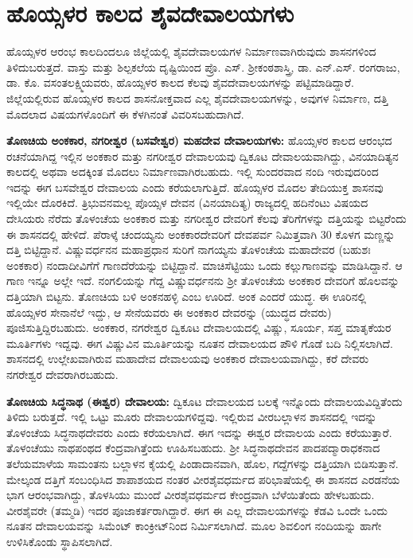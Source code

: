 \vskip -1pt

\section*{ಹೊಯ್ಸಳರ ಕಾಲದ ಶೈವದೇವಾಲಯಗಳು}

ಹೊಯ್ಸಳರ ಆರಂಭ ಕಾಲದಿಂದಲೂ ಜಿಲ್ಲೆಯಲ್ಲಿ ಶೈವದೇವಾಲಯಗಳ ನಿರ್ಮಾಣವಾಗಿರುವುದು ಶಾಸನಗಳಿಂದ ತಿಳಿದು\-ಬರುತ್ತದೆ. ವಾಸ್ತು ಮತ್ತು ಶಿಲ್ಪಕಲೆಯ ದೃಷ್ಟಿಯಿಂದ ಪ್ರೊ. ಎಸ್​. ಶ‍್ರೀಕಂಠಶಾಸ್ತ್ರಿ, ಡಾ. ಎನ್​.ಎಸ್​. ರಂಗರಾಜು, ಡಾ. ಕೊ. ವಸಂತಲಕ್ಷ್ಮಿ\-ಯವರು, ಹೊಯ್ಸಳರ ಕಾಲದ ಕೆಲವು ಶೈವದೇವಾಲಯಗಳನ್ನು ಪಟ್ಟಿಮಾಡಿದ್ದಾರೆ. ಜಿಲ್ಲೆಯಲ್ಲಿರುವ ಹೊಯ್ಸಳರ ಕಾಲದ ಶಾಸನೋಕ್ತವಾದ ಎಲ್ಲ ಶೈವದೇವಾಲಯಗಳನ್ನು, ಅವುಗಳ ನಿರ್ಮಾಣ, ದತ್ತಿ ಮೊದಲಾದ ವಿಷಯಗಳೊಂದಿಗೆ ಈ ಕೆಳಗಿನಂತೆ ವಿವರಿಸಬಹುದಾಗಿದೆ.

\textbf{ತೊಣಚಿಯ ಅಂಕಕಾರ, ನಗರೀಶ್ವರ (ಬಸವೇಶ್ವರ) ಮಹದೇವ ದೇವಾಲಯಗಳು:} ಹೊಯ್ಸಳರ ಕಾಲದ ಆರಂಭದ ರಚನೆಯಾಗಿದ್ದ ಇಲ್ಲಿನ ಅಂಕಕಾರ ಮತ್ತು ನಗರೀಶ್ವರ ದೇವಾಲಯವು ದ್ವಿಕೂಟ ದೇವಾಲಯವಾಗಿದ್ದು, ವಿನಯಾದಿತ್ಯನ ಕಾಲದಲ್ಲಿ ಅಥವಾ ಅದಕ್ಕಿಂತ ಮೊದಲು ನಿರ್ಮಾಣವಾಗಿರ\-ಬಹುದು. ಇಲ್ಲಿ ಸುಂದರವಾದ ನಂದಿ ಇರುವುದರಿಂದ ಇದನ್ನು ಈಗ ಬಸವೇಶ್ವರ ದೇವಾಲಯ ಎಂದು ಕರೆಯಲಾಗುತ್ತಿದೆ. ಹೊಯ್ಸಳರ ಮೊದಲ ತೇದಿಯುಕ್ತ ಶಾಸನವು ಇಲ್ಲಿಯೇ ದೊರಕಿದೆ. ತ್ರಿಭುವನಮಲ್ಲ ಪೊಯ್ಸಳ ದೇವನ (ವಿನಯಾದಿತ್ಯ) ರಾಜ್ಯದಲ್ಲಿ ಹದಿನೆಂಟು ವಿಷಯದ ದೇಸಿಯರು ನೆರೆದು ತೊಳಂಚೆಯ ಅಂಕಕಾರ ಮತ್ತು ನಗರೀಶ್ವರ ದೇವರಿಗೆ ಕೆಲವು ತೆರಿಗೆಗಳನ್ನು ದತ್ತಿಯನ್ನು ಬಿಟ್ಟರೆಂದು ಈ ಶಾಸನದಲ್ಲಿ ಹೇಳಿದೆ. ಪೆರಾಳ್ಕೆ ಚಂದಯ್ಯನು ಅಂಕಕಾರದೇವರಿಗೆ ದೇವಪರ್ವ ನಿಮಿತ್ತವಾಗಿ 30 ಕೊಳಗ ಮಣ್ಣನ್ನು ದತ್ತಿ ಬಿಟ್ಟಿದ್ದಾನೆ. ವಿಷ್ಣುವರ್ಧನನ ಮಹಾಪ್ರಧಾನ ಸುರಿಗೆ ನಾಗಯ್ಯನು ತೊಳಂಚೆಯ ಮಹಾದೇವರ (ಬಹುಶಃ ಅಂಕಕಾರ) ನಂದಾದೀವಿಗೆಗೆ ಗಾಣದೆರೆಯನ್ನು ಬಿಟ್ಟಿದ್ದಾನೆ. ಮಾಚಿಸೆಟ್ಟಿಯು ಒಂದು ಕಲ್ಲುಗಾಣವನ್ನು ಮಾಡಿಸಿದ್ದಾನೆ. ಆ ಗಾಣ ಇನ್ನೂ ಅಲ್ಲೇ ಇದೆ. ನಂಗಲಿಯನ್ನು ಗೆದ್ದ ವಿಷ್ಣುವರ್ಧನನು ಶ‍್ರೀ ತೊಳಂಚೆಯ ಅಂಕಕಾರ ದೇವರಿಗೆ ಹೊಲವನ್ನು ದತ್ತಿಯಾಗಿ ಬಿಟ್ಟನು. ತೊಣಚಿಯ ಬಳಿ ಅಂಕನಹಳ್ಳಿ ಎಂಬ ಊರಿದೆ. ಅಂಕ ಎಂದರೆ ಯುದ್ಧ. ಈ ಊರಿನಲ್ಲಿ ಹೊಯ್ಸಳರ ಸೇನಾನೆಲೆ ಇದ್ದು, ಆ ಸೇನೆಯವರು ಈ ಅಂಕಕಾರ ದೇವರನ್ನು (ಯುದ್ಧದ ದೇವರು) ಪೂಜಿಸುತ್ತಿದ್ದಿರಬಹುದು. ಅಂಕಕಾರ, ನಗರೇಶ್ವರ ದ್ವಿಕೂಟ ದೇವಾಲಯದಲ್ಲಿ ವಿಷ್ಣು, ಸೂರ್ಯ, ಸಪ್ತ ಮಾತೃಕೆಯರ ಮೂರ್ತಿಗಳು ಇದ್ದವು. ಈಗ ವಿಷ್ಣುವಿನ ಮೂರ್ತಿಯನ್ನು ನೂತನ ದೇವಾಲಯದ ಪೌಳಿ ಗೊಡೆ ಬದಿ ನಿಲ್ಲಿಸಲಾಗಿದೆ. ಶಾಸನದಲ್ಲಿ ಉಲ್ಲೇಖವಾಗಿರುವ ಮಹಾದೇವ ದೇವಾಲಯವು ಅಂಕಕಾರ ದೇವಾಲಯವಾಗಿದ್ದು, ಕರೆ ದೇವರು ನಗರೇಶ್ವರ ದೇವರಾಗಿರಬಹುದು.

\textbf{ತೊಣಚಿಯ ಸಿದ್ಧನಾಥ (ಈಶ್ವರ) ದೇವಾಲಯ:} ದ್ವಿಕೂಟ ದೇವಾಲಯದ ಬಲಕ್ಕೆ ಇನ್ನೊಂದು ದೇವಾಲಯವಿದ್ದಿತೆಂದು ತಿಳಿದು ಬರುತ್ತದೆ. ಇಲ್ಲಿ ಒಟ್ಟು ಮೂರು ದೇವಾಲಯಗಳಿದ್ದವು. ಇಲ್ಲಿರುವ ವೀರಬಲ್ಲಾಳನ ಶಾಸನದಲ್ಲಿ ಇದನ್ನು ತೊಳಂಚೆಯ ಸಿದ್ಧನಾಥದೇವರು ಎಂದು ಕರೆಯಲಾಗಿದೆ. ಈಗ ಇದನ್ನು ಈಶ್ವರ ದೇವಾಲಯ ಎಂದು ಕರೆಯುತ್ತಾರೆ. ತೊಳಂಚೆಯು ನಾಥಪಂಥದ ಕೆಂದ್ರವಾಗಿತ್ತೆಂದು ಊಹಿಸಬಹುದು. ಶ‍್ರೀ ಸಿದ್ಧನಾಥದೇವನ ಪಾದಪದ್ಮಾರಾಧಕ\-ನಾದ ತಲೆಯಮಾಳೆಯ ಸಾಮಂತನು ಬಲ್ಲಾಳನ ಕೈಯಲ್ಲಿ ಪಿಂಡಾದಾನವಾಗಿ, ಹೊಲ, ಗದ್ದೆಗಳನ್ನು ದತ್ತಿಯಾಗಿ ಬಿಡಿಸುತ್ತಾನೆ. ಮೇಲ್ಕಂಡ ದತ್ತಿಗೆ ಸಂಬಂಧಿಸಿದ ಶಾಪಾಶಯದ ನಂತರ ವೀರಶೈವಧರ್ಮದ ಪರಿಭಾಷೆಯಲ್ಲಿ ಈ ಶಾಸನದ ಎರಡನೆಯ ಭಾಗ ಆರಂಭವಾಗಿದ್ದು, ತೊಳಸಿಯು ಮುಂದೆ ವೀರಶೈವಧರ್ಮದ ಕೇಂದ್ರವಾಗಿ ಬೆಳೆಯಿತೆಂದು ಹೇಳಬಹುದು. ವೀರಶೈವರೇ (ತಮ್ಮಡಿ) ಇದರ ಪೂಜಾಕರ್ತರಾಗಿ\-ದ್ದಾರೆ. ಈಗ ಈ ಎಲ್ಲ ದೇವಾಲಯಗಳನ್ನು ಕೆಡವಿ ಒಂದೇ ಒಂದು ನೂತನ ದೇವಾಲಯವನ್ನು ಸಿಮೆಂಟ್ ಕಾಂಕ್ರೀಟ್‌ನಿಂದ ನಿರ್ಮಿಸಲಾಗಿದೆ. ಮೂಲ ಶಿವಲಿಂಗ ನಂದಿಯನ್ನು ಹಾಗೇ ಉಳಿಸಿಕೊಂಡು ಸ್ಥಾಪಿಸಲಾಗಿದೆ.

